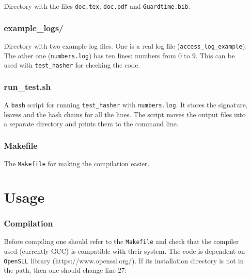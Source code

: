 \documentclass[11pt]{article}
\newcommand{\ct}[1]{\texttt{#1}}
\begin{document}
Directory with the files \ct{doc.tex}, \ct{doc.pdf} and \ct{Guardtime.bib}. 


\subsubsection*{example\_logs/} %
\label{ssub:example_logs_}

Directory with two example log files. One is a real log file (\ct{access\_log\_example}). The other one (\ct{numbers.log}) has ten lines: numbers from $0$ to $9$. This can be used with \ct{test\_hasher} for checking the code.


\subsubsection*{run\_test.sh} %
\label{ssub:run_test_sh}

A \ct{bash} script for running \ct{test\_hasher} with \ct{numbers.log}. It stores the signature, leaves and the hash chains for all the lines. The script moves the output files into a separate directory and prints them to the command line. 


\subsubsection*{Makefile} %
\label{ssub:makefile}

The \ct{Makefile} for making the compilation easier.



\section{Usage} %
\label{sec:usage}

\subsubsection{Compilation} %
\label{ssub:compilation}

Before compiling one should refer to the \ct{Makefile} and check that the compiler used (currently GCC) is compatible with their system. The code is dependent on \ct{OpenSLL} library (https://www.openssl.org/). If its installation directory is not in the path, then one should change line 27: 
\end{document}
